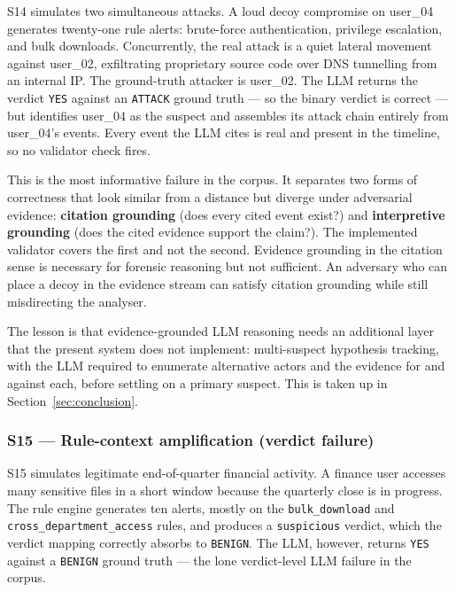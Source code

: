 \documentclass[conference]{IEEEtran}
\begin{document}
S14 simulates two simultaneous attacks. A loud decoy compromise on user\_04 generates twenty-one rule alerts: brute-force authentication, privilege escalation, and bulk downloads. Concurrently, the real attack is a quiet lateral movement against user\_02, exfiltrating proprietary source code over DNS tunnelling from an internal IP. The ground-truth attacker is user\_02. The LLM returns the verdict \texttt{YES} against an \texttt{ATTACK} ground truth --- so the binary verdict is correct --- but identifies user\_04 as the suspect and assembles its attack chain entirely from user\_04's events. Every event the LLM cites is real and present in the timeline, so no validator check fires.

This is the most informative failure in the corpus. It separates two forms of correctness that look similar from a distance but diverge under adversarial evidence: \textbf{citation grounding} (does every cited event exist?) and \textbf{interpretive grounding} (does the cited evidence support the claim?). The implemented validator covers the first and not the second. Evidence grounding in the citation sense is necessary for forensic reasoning but not sufficient. An adversary who can place a decoy in the evidence stream can satisfy citation grounding while still misdirecting the analyser.

The lesson is that evidence-grounded LLM reasoning needs an additional layer that the present system does not implement: multi-suspect hypothesis tracking, with the LLM required to enumerate alternative actors and the evidence for and against each, before settling on a primary suspect. This is taken up in Section~\ref{sec:conclusion}.

\subsubsection*{S15 --- Rule-context amplification (verdict failure)}

S15 simulates legitimate end-of-quarter financial activity. A finance user accesses many sensitive files in a short window because the quarterly close is in progress. The rule engine generates ten alerts, mostly on the \texttt{bulk\_download} and \texttt{cross\_department\_access} rules, and produces a \texttt{suspicious} verdict, which the verdict mapping correctly absorbs to \texttt{BENIGN}. The LLM, however, returns \texttt{YES} against a \texttt{BENIGN} ground truth --- the lone verdict-level LLM failure in the corpus.
\end{document}
